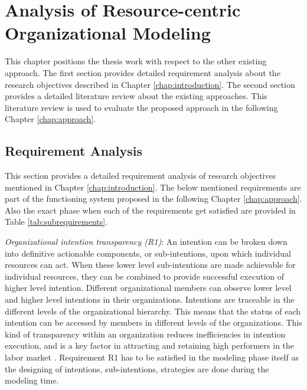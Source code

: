 \chapter{Analysis of Resource-centric Organizational Modeling}
\label{chap:analysis}

This chapter positions the thesis work with respect to the other existing approach. The first section provides detailed requirement analysis about the research objectives described in Chapter \ref{chap:introduction}. The second section provides a detailed literature review about the existing approaches. This literature review is used to evaluate the proposed approach in the following Chapter \ref{chap:approach}.

\section{Requirement Analysis}
\label{sec:requirementssupoorting}
This section provides a detailed requirement analysis of research objectives mentioned in Chapter \ref{chap:introduction}. The below mentioned requirements are part of the functioning system proposed in the following Chapter \ref{chap:approach}. Also the exact phase when each of the requirements get satisfied are provided in Table \ref{tab:subrequirements}.

\textit{Organizational intention transparency (R1)}:  An intention can be broken down into definitive actionable components, or sub-intentions, upon which individual resources can act. When these lower level sub-intentions are made  achievable for individual resources, they can be combined to provide successful execution of higher level intention. Different organizational members can observe lower level and higher level intentions in their organizations. Intentions are traceable in the different levels of the organizational hierarchy. This means that the status of each intention can be accessed by members in different levels of the organizations. This kind of transparency within an organization reduces inefficiencies in intention execution, and is a key factor in attracting and retaining high  performers in the labor market \cite{McManus2007}. Requirement R1 has to be satisfied in the modeling phase itself as the designing of intentions, sub-intentions, strategies are done during the modeling time. 

